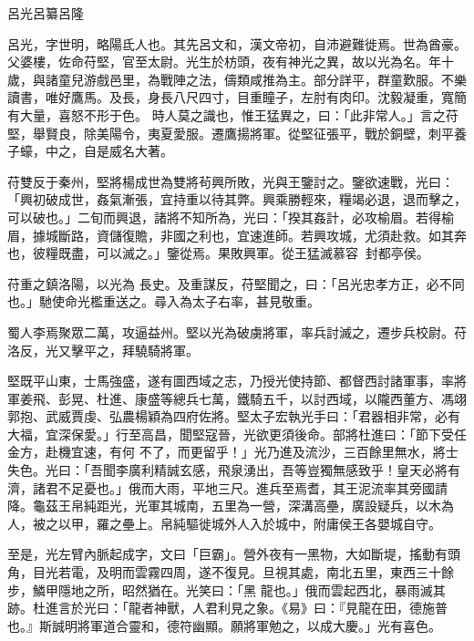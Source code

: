 
\begin{pinyinscope}

 呂光呂纂呂隆



 呂光，字世明，略陽氐人也。其先呂文和，漢文帝初，自沛避難徙焉。世為酋豪。父婆樓，佐命苻堅，官至太尉。光生於枋頭，夜有神光之異，故以光為名。年十歲，與諸童兒游戲邑里，為戰陣之法，儔類咸推為主。部分詳平，群童歎服。不樂讀書，唯好鷹馬。及長，身長八尺四寸，目重瞳子，左肘有肉印。沈毅凝重，寬簡有大量，喜怒不形于色。
 時人莫之識也，惟王猛異之，曰：「此非常人。」言之苻堅，舉賢良，除美陽令，夷夏愛服。遷鷹揚將軍。從堅征張平，戰於銅壁，刺平養子蠔，中之，自是威名大著。



 苻雙反于秦州，堅將楊成世為雙將茍興所敗，光與王鑒討之。鑒欲速戰，光曰：「興初破成世，姦氣漸張，宜持重以待其弊。興乘勝輕來，糧竭必退，退而擊之，可以破也。」二旬而興退，諸將不知所為，光曰：「揆其姦計，必攻榆眉。若得榆眉，據城斷路，資儲復贍，非國之利也，宜速進師。若興攻城，尤須赴救。如其奔也，彼糧既盡，可以滅之。」鑒從焉。果敗興軍。從王猛滅慕容，封都亭侯。



 苻重之鎮洛陽，以光為
 長史。及重謀反，苻堅聞之，曰：「呂光忠孝方正，必不同也。」馳使命光檻重送之。尋入為太子右率，甚見敬重。



 蜀人李焉聚眾二萬，攻逼益州。堅以光為破虜將軍，率兵討滅之，遷步兵校尉。苻洛反，光又擊平之，拜驍騎將軍。



 堅既平山東，士馬強盛，遂有圖西域之志，乃授光使持節、都督西討諸軍事，率將軍姜飛、彭晃、杜進、康盛等總兵七萬，鐵騎五千，以討西域，以隴西董方、馮翊郭抱、武威賈虔、弘農楊穎為四府佐將。堅太子宏執光手曰：「君器相非常，必有大福，宜深保愛。」行至高昌，聞堅寇晉，光欲更須後命。部將杜進曰：「節下受任金方，赴機宜速，有何
 不了，而更留乎！」光乃進及流沙，三百餘里無水，將士失色。光曰：「吾聞李廣利精誠玄感，飛泉湧出，吾等豈獨無感致乎！皇天必將有濟，諸君不足憂也。」俄而大雨，平地三尺。進兵至焉耆，其王泥流率其旁國請降。龜茲王帛純距光，光軍其城南，五里為一營，深溝高壘，廣設疑兵，以木為人，被之以甲，羅之壘上。帛純驅徙城外人入於城中，附庸侯王各嬰城自守。



 至是，光左臂內脈起成字，文曰「巨霸」。營外夜有一黑物，大如斷堤，搖動有頭角，目光若電，及明而雲霧四周，遂不復見。旦視其處，南北五里，東西三十餘步，鱗甲隱地之所，昭然猶在。光笑曰：「黑
 龍也。」俄而雲起西北，暴雨滅其跡。杜進言於光曰：「龍者神獸，人君利見之象。《易》曰：『見龍在田，德施普也。』斯誠明將軍道合靈和，德符幽顯。願將軍勉之，以成大慶。」光有喜色。




\end{pinyinscope}
